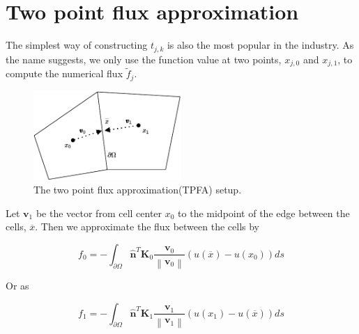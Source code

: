 \documentclass[../Main/main.tex]{subfiles}
\begin{document}
\section*{Two point flux approximation}
The simplest way of constructing $t_{j,k}$ is also the most popular in the industry. As the name suggests, we only use the function value at two points, $x_{j,0}$ and $x_{j,1}$, to compute the numerical flux $\tilde{f}_j$.
\begin{figure}[H]
	\centering
	\includegraphics[width=0.5\textwidth]{two point.pdf}
	\caption{The two point flux approximation(TPFA) setup.}
\end{figure}
Let $\pmb{v}_1$ be the vector from cell center $x_0$ to the midpoint of the edge between the cells, $\overline{x}$. Then we approximate the flux between the cells by

\begin{equation}
	f_0=-\int_{\partial \Omega} \hat{\pmb{n}}^T \pmb{K}_0  \frac{\pmb{v}_0}{\left \| \pmb{v}_0 \right \|} (u(\overline{x})-u(x_0))ds
\end{equation}

Or as

\begin{equation}
	f_1 = -\int_{\partial \Omega} \hat{\pmb{n}}^T \pmb{K}_1  \frac{\pmb{v}_1}{\left \| \pmb{v}_1 \right \|} (u(x_1)-u(\overline{x}))ds
\end{equation}	
\end{document}
